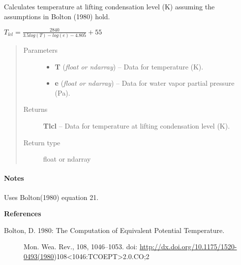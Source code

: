 \documentclass[letterpaper,10pt,english]{sphinxmanual}
\begin{document}
\begin{fulllineitems}
\label{atmos:atmos.equations.Tlcl_from_T_e}
Calculates temperature at lifting condensation level (K) assuming the
assumptions in Bolton (1980) hold.

\(T_{lcl} = \frac{2840}{3.5 log(T) - log(e) - 4.805} + 55\)
\begin{quote}\begin{description}
\item[{Parameters}] \leavevmode\begin{itemize}
\item {} 
\textbf{T} (\emph{float or ndarray}) -- Data for temperature (K).

\item {} 
\textbf{e} (\emph{float or ndarray}) -- Data for water vapor partial pressure (Pa).

\end{itemize}

\item[{Returns}] \leavevmode
\textbf{Tlcl} --
Data for temperature at lifting condensation level (K).

\item[{Return type}] \leavevmode
float or ndarray

\end{description}\end{quote}
\paragraph{Notes}

Uses Bolton(1980) equation 21.

\textbf{References}
\begin{description}
\item[{Bolton, D. 1980: The Computation of Equivalent Potential Temperature.}] \leavevmode
Mon. Wea. Rev., 108, 1046–1053.
doi: \href{http://dx.doi.org/10.1175/1520-0493(1980}{http://dx.doi.org/10.1175/1520-0493(1980})108\textless{}1046:TCOEPT\textgreater{}2.0.CO;2

\end{description}

\end{fulllineitems}

\end{document}
